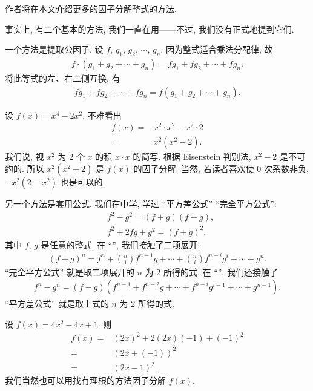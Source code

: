作者将在本文介绍更多的因子分解整式的方法.

事实上, 有二个基本的方法, 我们一直在用——不过, 我们没有正式地提到它们.

一个方法是提取公因子. 设 $f$, $g_1$, $g_2$, $\cdots$, $g_n$. 因为整式适合乘法分配律, 故
\begin{align*}
    f \cdot (g_1 + g_2 + \cdots + g_n) = fg_1 + fg_2 + \cdots + fg_n.
\end{align*}
将此等式的左、右二侧互换, 有
\begin{align*}
    fg_1 + fg_2 + \cdots + fg_n = f(g_1 + g_2 + \cdots + g_n).
\end{align*}

\begin{example}
    设 $f(x) = x^4 - 2x^2$. 不难看出
    \begin{align*}
        f(x)
        = {} & x^2 \cdot x^2 - x^2 \cdot 2 \\
        = {} & x^2 (x^2 - 2).
    \end{align*}
    我们说, 视 $x^2$ 为 $2$ 个 $x$ 的积 $x \cdot x$ 的简写. 根据 Eisenstein 判别法, $x^2 - 2$ 是不可约的. 所以 $x^2 (x^2 - 2)$ 是 $f(x)$ 的因子分解. 当然, 若读者喜欢使 $0$ 次系数非负, $-x^2 (2 - x^2)$ 也是可以的.
\end{example}

另一个方法是套用公式. 我们在中学, 学过 ``平方差公式'' ``完全平方公式'':
\begin{align*}
     & f^2 - g^2 = (f + g) (f - g),      \\
     & f^2 \pm 2 fg + g^2 = (f \pm g)^2,
\end{align*}
其中 $f$, $g$ 是任意的整式. 在 ``\GeneralizedBinomialCoefficients '', 我们接触了二项展开:
\begin{align*}
    (f + g)^n = f^n + \binom{n}{1} f^{n-1} g + \cdots + \binom{n}{i} f^{n-i} g^i + \cdots + g^n.
\end{align*}
``完全平方公式'' 就是取二项展开的 $n$ 为 $2$ 所得的式. 在 ``\SyntheticDivision '', 我们还接触了
\begin{align*}
    f^n - g^n = (f - g)(f^{n-1} + f^{n-2} g + \cdots + f^{n-i} g^{i-1} + \cdots + g^{n-1}).
\end{align*}
``平方差公式'' 就是取上式的 $n$ 为 $2$ 所得的式.

\begin{example}
    设 $f(x) = 4x^2 - 4x + 1$. 则
    \begin{align*}
        f(x)
        = {} & (2x)^2 + 2 (2x) (-1) + (-1)^2 \\
        = {} & (2x + (-1))^2                 \\
        = {} & (2x - 1)^2.
    \end{align*}
    我们当然也可以用找有理根的方法因子分解 $f(x)$.
\end{example}


